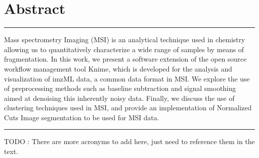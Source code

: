 \documentclass[11pt,openany]{book}
\begin{document}
\section*{\hfil Abstract \hfil} %

\noindent\rule[0.5ex]{\linewidth}{1pt}
Mass spectrometry Imaging (MSI) is an analytical technique used in chemistry allowing us to quantitatively characterize a wide range of samples by means of fragmentation. In this work, we present a software extension of the open source workflow management tool Knime, which is developed for the analysis and visualization of imzML data, a common data format in MSI. We explore the use of preprocessing methods such as baseline subtraction and signal smoothing aimed at denoising this inherently noisy data. Finally, we discuss the use of clustering techniques used in MSI, and provide an implementation of Normalized Cuts Image segmentation to be used for MSI data. \\
\noindent\rule[0.5ex]{\linewidth}{1pt}

\vfill
\newpage





\tableofcontents

\listoffigures
{}

\clearpage
\printglossary[type=\acronymtype]



TODO : There are more acronyms to add here, just need to reference them in the text. 


\end{document}
